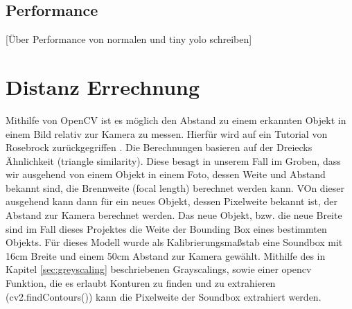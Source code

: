 \subsection{Performance}\label{sec:performance}

[Über Performance von normalen und tiny yolo schreiben]

\section{Distanz Errechnung}\label{sec:distance}

Mithilfe von OpenCV ist es möglich den Abstand zu einem erkannten Objekt in einem Bild relativ zur Kamera zu messen.
Hierfür wird auf ein Tutorial von Rosebrock zurückgegriffen \cite{AdrianRosebrock.2015}.
Die Berechnungen basieren auf der Dreiecks Ähnlichkeit (triangle similarity). Diese besagt in unserem Fall im Groben, dass wir ausgehend von einem Objekt in einem Foto, dessen Weite und Abstand bekannt sind, die Brennweite (focal length) berechnet werden kann. VOn dieser ausgehend kann dann für ein neues Objekt, dessen Pixelweite bekannt ist, der Abstand zur Kamera berechnet werden. Das neue Objekt, bzw. die neue Breite sind im Fall dieses Projektes die Weite der Bounding Box eines bestimmten Objekts.
Für dieses Modell wurde als Kalibrierungsmaßstab eine Soundbox mit 16cm Breite und einem 50cm Abstand zur Kamera gewählt. Mithilfe des in Kapitel \ref{sec:greyscaling} beschriebenen Grayscalings, sowie einer opencv Funktion, die es erlaubt Konturen zu finden und zu extrahieren (cv2.findContours()) kann die Pixelweite der Soundbox extrahiert werden.

